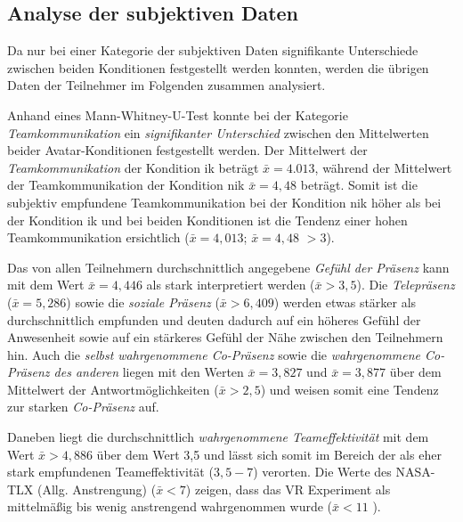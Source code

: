 \documentclass[a4paper,11pt]{article}%
\renewcommand{\\}{\vspace*{0.5\baselineskip} \newline}
\begin{document}
{{%
\subsection{Analyse der subjektiven Daten}

Da nur bei einer Kategorie der subjektiven Daten signifikante Unterschiede zwischen beiden Konditionen festgestellt werden konnten, werden die übrigen Daten der Teilnehmer im Folgenden zusammen analysiert.

Anhand eines Mann-Whitney-U-Test konnte bei der Kategorie \textit{Teamkommunikation} ein \textit{signifikanter Unterschied} zwischen den Mittelwerten beider Avatar-Konditionen festgestellt werden. Der Mittelwert der \textit{Teamkommunikation} der Kondition \ac{ik} beträgt $\bar{x} = 4.013$, während der Mittelwert der Teamkommunikation der Kondition \ac{nik} $\bar{x} = 4,48$ beträgt. Somit ist die subjektiv empfundene Teamkommunikation bei der Kondition \ac{nik} höher als bei der Kondition \ac{ik} und bei beiden Konditionen ist die Tendenz einer hohen Teamkommunikation ersichtlich ($\bar{x} = 4,013$; $\bar{x} = 4,48$ $ > 3$).

Das von allen Teilnehmern durchschnittlich angegebene \textit{Gefühl der Präsenz} kann mit dem Wert $\bar{x} = 4,446$ als stark interpretiert werden ($\bar{x} > 3,5$). Die \textit{Telepräsenz} ($\bar{x} = 5,286$) sowie die \textit{soziale Präsenz} ($\bar{x} > 6,409$) werden etwas stärker als durchschnittlich empfunden und deuten dadurch auf ein höheres Gefühl der Anwesenheit sowie auf ein stärkeres Gefühl der Nähe zwischen den Teilnehmern hin. Auch die \textit{selbst wahrgenommene Co-Präsenz} sowie die \textit{wahrgenommene Co-Präsenz des anderen} liegen mit den Werten $\bar{x} = 3,827$ und $\bar{x} = 3,877$ über dem Mittelwert der Antwortmöglichkeiten ($\bar{x} > 2,5$) und weisen somit eine Tendenz zur starken \textit{Co-Präsenz} auf.

Daneben liegt die durchschnittlich \textit{wahrgenommene Teameffektivität} mit dem Wert $\bar{x} > 4,886$ über dem Wert 3,5 und lässt sich somit im Bereich der als eher stark empfundenen Teameffektivität ($3,5 - 7$) verorten.
Die Werte des NASA-TLX (Allg. Anstrengung) ($\bar{x} < 7$) zeigen, dass das VR Experiment als mittelmäßig bis wenig anstrengend wahrgenommen wurde ($\bar{x} < 11$ ).


}}
\end{document}

